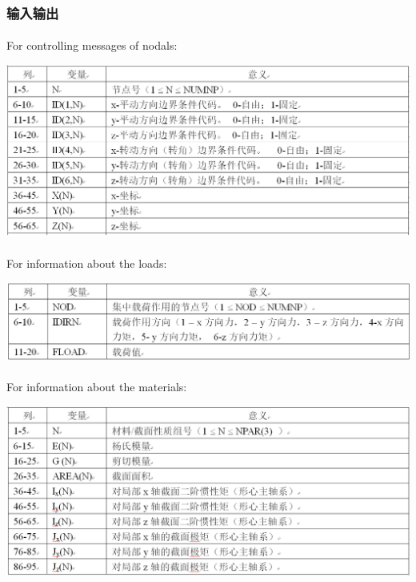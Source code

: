 \documentclass[UTF8]{ctexbook}
\begin{document}
\subsubsection{输入输出}
\paragraph{}For controlling messages of nodals:
\begin{center}
\includegraphics[width=1.0\textwidth]{beam3.png}
\end{center}
\paragraph{}For information about the loads:
\begin{center}
\includegraphics[width=1.0\textwidth]{beam4.png}
\end{center}
\paragraph{}For information about the materials:
\begin{center}
\includegraphics[width=1.0\textwidth]{beam5.png}
\end{center}
\end{document}
